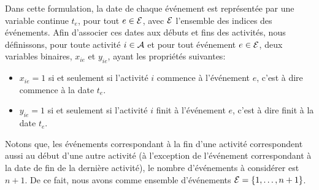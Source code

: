 Dans cette formulation, la date de chaque événement est représentée
par une variable continue $t_e$, pour tout $e \in {\cal E}$, avec
${\cal E}$ l'ensemble des indices des événements. Afin d'associer
ces dates aux débuts et fins des activités, nous définissons, pour
toute activité $i \in {\cal A}$ et pour tout événement $e \in {\cal E}$, deux
variables binaires, $x_{ie}$ et $y_{ie}$, ayant les propriétés
suivantes: 
\begin{itemize}
 \item $x_{ie}=1$ si et seulement si
l'activité $i$ commence à l'événement $e$, c'est à dire commence à
la date $t_e$. 
\item $y_{ie}=1$ si et seulement si l'activité $i$
finit à l'événement $e$, c'est à dire finit à la date $t_e$.
\end{itemize} 
Notons que, les événements correspondant à la fin
d'une activité correspondent aussi au début d'une autre activité
(à l'exception de l'événement correspondant à la date de fin de la
dernière activité), le nombre d'événements à considérer est $n+1$. De
ce fait, nous avons comme ensemble d'événements ${\cal
  E}=\{1,\dots,n+1\}$. 

